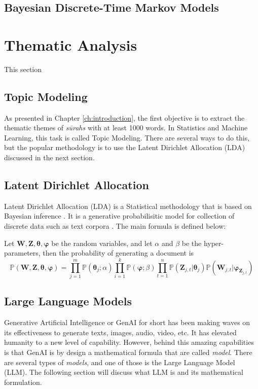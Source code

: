 \subsection{Bayesian Discrete-Time Markov Models}
\section{Thematic Analysis}
This section 
\subsection{Topic Modeling}\label{sec:topic_modeling_method}
As presented in Chapter \ref{ch:introduction}, the first objective is to extract the thematic themes of \textit{s\=urahs}  with at least 1000 words. In Statistics and Machine Learning, this task is called Topic Modeling. There are several ways to do this, but the popular methodology is to use the Latent Dirichlet Allocation (LDA) discussed in the next section.
\subsection{Latent Dirichlet Allocation}\label{sec:lda}
Latent Dirichlet Allocation (LDA) is a Statistical methodology that is based on Bayesian inference \cite{bayes,laplace1986}. It is a generative probabilisitic model for collection of discrete data such as text corpora \cite{blei2003latent}. The main formula is defined below:
\begin{defnx}
Let $\mathbf{W},\mathbf{Z},\boldsymbol{\theta},\boldsymbol{\varphi}$ be the random variables, and let $\alpha$ and $\beta$ be the hyper-parameters, then the probability of generating a document is
\begin{equation}
    \mathbb{P}(\mathbf{W},\mathbf{Z},\boldsymbol{\theta},\boldsymbol{\varphi})=\prod_{j=1}^m\mathbb{P}(\boldsymbol{\theta}_j;\alpha)\prod_{i=1}^{k}\mathbb{P}(\boldsymbol{\varphi};\beta)\prod_{t=1}^{n}\mathbb{P}(\mathbf{Z}_{j,t}|\boldsymbol{\theta}_j)\mathbb{P}(\mathbf{W}_{j,t}|\boldsymbol{\varphi}_{\mathbf{Z}_{j,t}})
\end{equation}
\end{defnx}
\subsection{Large Language Models}\label{sec:llm_method}
Generative Artificial Intelligence or GenAI for short has been making waves on its effectiveness to generate texts, images, audio, video, etc. It has elevated humanity to a new level of capability. However, behind this amazing capabilities is that GenAI is by design a mathematical formula that are called \textit{model}. There are several types of \textit{models}, and one of those is the Large Language Model (LLM). The following section will discuss what LLM is and its mathematical formulation.
